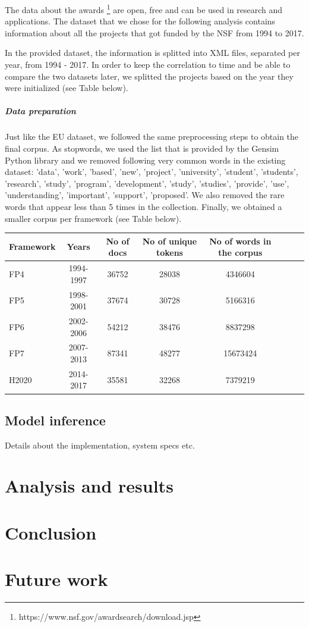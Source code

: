 \documentclass[12pt]{report}
\begin{document}
The data about the awards \footnote{https://www.nsf.gov/awardsearch/download.jsp} are open, free and can be used in research and applications. The dataset that we chose for the following analysis contains information about all the projects that got funded by the NSF from 1994 to 2017.
 
In the provided dataset, the information is splitted into XML files, separated per year, from 1994 - 2017. In order to keep the correlation to time and be able to compare the two datasets later, we splitted the projects based on the year they were initialized (see Table below).

\subparagraph{Data preparation}

Just like the EU dataset, we followed the same preprocessing steps to obtain the final corpus. As stopwords, we used the list that is provided by the Gensim Python library and we removed following very common words in the existing dataset: 'data', 'work', 'based', 'new', 'project', 'university', 'student', 'students', 'research', 'study', 'program', 'development', 'study', 'studies', 'provide', 'use', 'understanding', 'important', 'support', 'proposed'. We also removed the rare words that appear less than 5 times in the collection. Finally, we obtained a smaller corpus per framework (see Table below).

\begin{center}
\begin{tabular}{l*{6}{c}r}
Framework         & Years & No of docs & No of unique tokens & No of words in the corpus \\
\hline
FP4 & 1994-1997 & 36752 & 28038 & 4346604 \\
FP5 & 1998-2001 & 37674 & 30728 & 5166316 \\
FP6 & 2002-2006 & 54212 & 38476 & 8837298 \\
FP7 & 2007-2013 & 87341 & 48277 & 15673424 \\
H2020 & 2014-2017 & 35581 & 32268 & 7379219 \\
\end{tabular}
\end{center}

\subsection{Model inference}

Details about the implementation, system specs etc.


\section{Analysis and results}


\section{Conclusion}

\section{Future work}

{}

\end{document}
